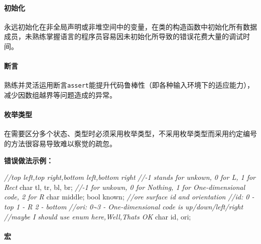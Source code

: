 \documentclass[
]{article}
\newenvironment{Shaded}{}{}
\newcommand{\CommentTok}[1]{\textcolor[rgb]{0.38,0.63,0.69}{\textit{#1}}}
\newcommand{\DataTypeTok}[1]{\textcolor[rgb]{0.56,0.13,0.00}{#1}}
\newcommand{\FunctionTok}[1]{\textcolor[rgb]{0.02,0.16,0.49}{#1}}
\newcommand{\NormalTok}[1]{#1}
\newcommand{\OperatorTok}[1]{\textcolor[rgb]{0.40,0.40,0.40}{#1}}
\begin{document}
\hypertarget{ux521dux59cbux5316}{%
\paragraph{初始化}\label{ux521dux59cbux5316}}

永远初始化在非全局声明或非堆空间中的变量，在类的构造函数中初始化所有数据成员，未熟练掌握语言的程序员容易因未初始化所导致的错误花费大量的调试时间。

\hypertarget{ux65adux8a00}{%
\paragraph{断言}\label{ux65adux8a00}}

熟练并灵活运用断言\texttt{assert}能提升代码鲁棒性（即各种输入环境下的适应能力），减少因数组越界等问题造成的异常。

\hypertarget{ux679aux4e3eux7c7bux578b}{%
\paragraph{枚举类型}\label{ux679aux4e3eux7c7bux578b}}

在需要区分多个状态、类型时必须采用枚举类型，不采用枚举类型而采用约定编号的方法很容易导致难以察觉的疏忽。

\textbf{错误做法示例：}

\begin{Shaded}
\begin{Highlighting}[]
\CommentTok{//top left,top right,bottom left,bottom right}
\CommentTok{//{-}1 stands for unkown, 0 for \textquotesingle{}L\textquotesingle{}, 1 for Rect}
\DataTypeTok{char}\NormalTok{ tl}\OperatorTok{,} \FunctionTok{tr}\OperatorTok{,}\NormalTok{ bl}\OperatorTok{,}\NormalTok{ br}\OperatorTok{;}
\CommentTok{//{-}1 for unkown, 0 for Nothing, 1 for One{-}dimensional code, 2 for \textquotesingle{}R\textquotesingle{}}
\DataTypeTok{char}\NormalTok{ middle}\OperatorTok{;}
\DataTypeTok{bool}\NormalTok{ known}\OperatorTok{;}
\CommentTok{//ore surface id and orientation}
\CommentTok{//id: 0 {-} top 1 {-} \textquotesingle{}R\textquotesingle{} 2 {-} bottom}
\CommentTok{//ori: 0\textasciitilde{}3 {-} One{-}dimensional code is up/down/left/right}
\CommentTok{//maybe I should use enum here,Well,That\textquotesingle{}s OK}
\DataTypeTok{char}\NormalTok{ id}\OperatorTok{,}\NormalTok{ ori}\OperatorTok{;}
\end{Highlighting}
\end{Shaded}

\hypertarget{ux5b8f}{%
\paragraph{宏}\label{ux5b8f}}
\end{document}
